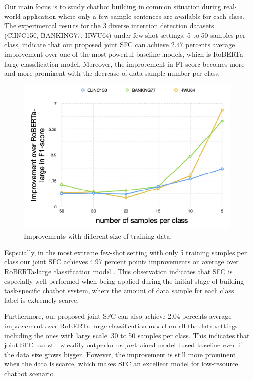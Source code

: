 \documentclass[letterpaper]{article} %
\begin{document}
  Our main focus  is  to  study  chatbot  building  in common situation during real-world
  application  where  only  a few sample sentences are available for each class.
  The  experimental  results  for  the  3  diverse  intention detection datasets
  (ClINC150,  BANKING77,  HWU64)  under  few-shot  settings, 5 to 50 samples per
  class,  indicate that our proposed joint SFC can achieve 2.47 percents average
  improvement   over  one  of  the  most  powerful  baseline  models,  which  is
  RoBERTa-large  classification  model.  Moreover,  the  improvement  in F1 score
  becomes  more  and  more prominent with the decrease of data sample number per
  class.

  \begin{figure}[t]
    \begin{centering}
      \includegraphics[scale=0.2]{picture/improvement_trend.jpg} 
      \par
    \end{centering}
    \caption{
      Improvements with different size of training data.
    }
    \label{fig:trend}
  \end{figure}

  Especially,  in the most extreme few-shot setting with only 5 training samples
  per  class  our joint SFC achieves 4.97 percent points improvements on average
  over  RoBERTa-large classification model . This observation indicates that SFC
  is  especially  well-performed  when being applied during the initial stage of
  building  task-specific  chatbot  system,  where the amount of data sample for
  each class label is extremely scarce.

  Furthermore,  our  proposed  joint  SFC can also achieve 2.04 percents average
  improvement  over  RoBERTa-large classification model on all the data settings
  including  the  ones  with  large  scale,  30  to  50  samples per class. This
  indicates that joint SFC can still steadily outperforms pretrained model based
  baseline even if the data size grows bigger. However, the improvement is still
  more prominent when the data is scarce, which makes SFC an excellent model for
  low-resource chatbot scenario.
\end{document}
